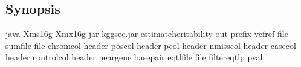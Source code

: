 \documentclass[letterpaper,10pt,english,openany,oneside]{sphinxmanual}
\begin{document}
\subsection{Synopsis}
\label{\detokenize{detailed_document:id9}}
\begin{sphinxVerbatim}[commandchars=\\\{\}]
java \PYGZhy{}Xms16g \PYGZhy{}Xmx16g \PYGZhy{}jar kggsee.jar
  \PYGZhy{}\PYGZhy{}estimate\PYGZhy{}heritability
  \PYGZhy{}\PYGZhy{}out \PYGZlt{}prefix\PYGZgt{}
  \PYGZhy{}\PYGZhy{}vcf\PYGZhy{}ref \PYGZlt{}file\PYGZgt{}
  \PYGZhy{}\PYGZhy{}sum\PYGZhy{}file \PYGZlt{}file\PYGZgt{}
  \PYGZhy{}\PYGZhy{}chrom\PYGZhy{}col \PYGZlt{}header\PYGZgt{}  
  \PYGZhy{}\PYGZhy{}pos\PYGZhy{}col \PYGZlt{}header\PYGZgt{}  
  \PYGZhy{}\PYGZhy{}p\PYGZhy{}col \PYGZlt{}header\PYGZgt{}  
  \PYGZhy{}\PYGZhy{}nmiss\PYGZhy{}col \PYGZlt{}header\PYGZgt{}  
  \PYGZhy{}\PYGZhy{}case\PYGZhy{}col \PYGZlt{}header\PYGZgt{}
  \PYGZhy{}\PYGZhy{}control\PYGZhy{}col \PYGZlt{}header\PYGZgt{}
  \PYGZhy{}\PYGZhy{}neargene \PYGZlt{}basepair\PYGZgt{}  
  \PYGZhy{}\PYGZhy{}eqtl\PYGZhy{}file \PYGZlt{}file\PYGZgt{}
  \PYGZhy{}\PYGZhy{}filter\PYGZhy{}eqtl\PYGZhy{}p \PYGZlt{}pval\PYGZgt{}  
\end{sphinxVerbatim}
\end{document}
